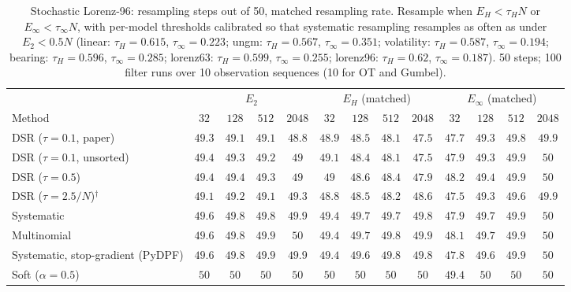 \begin{table}[ht]
\centering
\small
\caption{Stochastic Lorenz-96: resampling steps out of 50, matched resampling rate. Resample when $E_H<\tau_HN$ or $E_\infty<\tau_\infty N$, with per-model thresholds calibrated so that systematic resampling resamples as often as under $E_2<0.5N$ (linear: $\tau_H{=}0.615$, $\tau_\infty{=}0.223$; ungm: $\tau_H{=}0.567$, $\tau_\infty{=}0.351$; volatility: $\tau_H{=}0.587$, $\tau_\infty{=}0.194$; bearing: $\tau_H{=}0.596$, $\tau_\infty{=}0.285$; lorenz63: $\tau_H{=}0.599$, $\tau_\infty{=}0.255$; lorenz96: $\tau_H{=}0.62$, $\tau_\infty{=}0.187$). 50 steps; 100 filter runs over 10 observation sequences (10 for OT and Gumbel).}
\label{tab:trigger-matched-lorenz96-resampling_steps}
\begin{adjustbox}{max width=\linewidth}
\begin{tabular}{lcccc|cccc|cccc}
\toprule
 & \multicolumn{4}{c}{$E_2$} & \multicolumn{4}{c}{$E_H$ (matched)} & \multicolumn{4}{c}{$E_\infty$ (matched)} \\
\cmidrule(lr){2-5} \cmidrule(lr){6-9} \cmidrule(lr){10-13}
Method & $32$ & $128$ & $512$ & $2048$ & $32$ & $128$ & $512$ & $2048$ & $32$ & $128$ & $512$ & $2048$ \\
\midrule
DSR ($\tau{=}0.1$, paper) & $49.3$ & $49.1$ & $49.1$ & $48.8$ & $48.9$ & $48.5$ & $48.1$ & $47.5$ & $47.7$ & $49.3$ & $49.8$ & $49.9$ \\
DSR ($\tau{=}0.1$, unsorted) & $49.4$ & $49.3$ & $49.2$ & $49$ & $49.1$ & $48.4$ & $48.1$ & $47.5$ & $47.9$ & $49.3$ & $49.9$ & $50$ \\
DSR ($\tau{=}0.5$) & $49.4$ & $49.4$ & $49.3$ & $49$ & $49$ & $48.6$ & $48.4$ & $47.9$ & $48.2$ & $49.4$ & $49.9$ & $50$ \\
DSR ($\tau{=}2.5/N$)$^\dagger$ & $49.1$ & $49.2$ & $49.1$ & $49.3$ & $48.8$ & $48.5$ & $48.2$ & $48.6$ & $47.5$ & $49.3$ & $49.6$ & $49.9$ \\
\midrule
Systematic & $49.6$ & $49.8$ & $49.8$ & $49.9$ & $49.4$ & $49.7$ & $49.7$ & $49.8$ & $47.9$ & $49.7$ & $49.9$ & $50$ \\
Multinomial & $49.6$ & $49.8$ & $49.9$ & $50$ & $49.4$ & $49.7$ & $49.8$ & $49.9$ & $48.1$ & $49.7$ & $49.9$ & $50$ \\
Systematic, stop-gradient (PyDPF) & $49.6$ & $49.8$ & $49.9$ & $49.9$ & $49.4$ & $49.6$ & $49.8$ & $49.8$ & $47.8$ & $49.6$ & $49.9$ & $50$ \\
Soft ($\alpha{=}0.5$) & $50$ & $50$ & $50$ & $50$ & $50$ & $50$ & $50$ & $50$ & $49.4$ & $50$ & $50$ & $50$ \\

\end{tabular}
\end{adjustbox}
\end{table}
